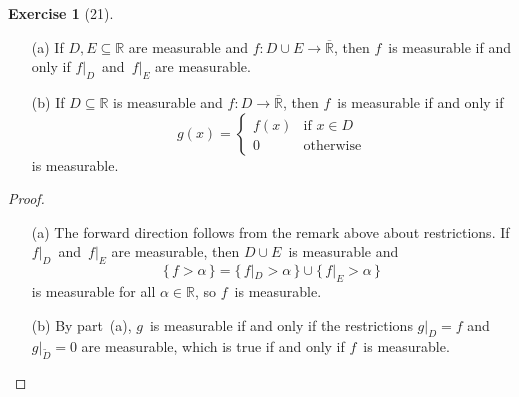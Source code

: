 \documentclass[letterpaper,12pt]{article}
\newcommand{\R}{\mathbb{R}}
\newcommand{\Rex}{\overline{\R}}
\newcommand{\union}{\cup}
\newcommand{\comp}[1]{\widetilde{#1}}
\newcommand{\res}[2]{{#1}|_{#2}}
\theoremstyle{plain}
\theoremstyle{definition}
\newtheorem*{exer}{Exercise}
\theoremstyle{remark}
\begin{document}
\begin{exer}[21]\ 
\begin{enumerate}
\item[(a)] If \(D,E\subseteq\R\) are measurable and \(f:D\union E\to\Rex\), then \(f\)~is measurable if and only if \(\res{f}{D}\)~and~\(\res{f}{E}\) are measurable.
\item[(b)] If \(D\subseteq\R\) is measurable and \(f:D\to\Rex\), then \(f\)~is measurable if and only if
\[g(x)=\begin{cases}
f(x)&\text{if }x\in D\\
0&\text{otherwise}
\end{cases}\]
is measurable.
\end{enumerate}
\end{exer}
\begin{proof}\ 
\begin{enumerate}
\item[(a)] The forward direction follows from the remark above about restrictions. If \(\res{f}{D}\)~and~\(\res{f}{E}\) are measurable, then \(D\union E\)~is measurable and
\[\{\,f>\alpha\,\}=\{\,\res{f}{D}>\alpha\,\}\union\{\,\res{f}{E}>\alpha\,\}\]
is measurable for all \(\alpha\in\R\), so \(f\)~is measurable.
\item[(b)] By part~(a), \(g\)~is measurable if and only if the restrictions \(\res{g}{D}=f\) and \(\res{g}{\comp{D}}=0\) are measurable, which is true if and only if \(f\)~is measurable.\qedhere
\end{enumerate}
\end{proof}
\end{document}

